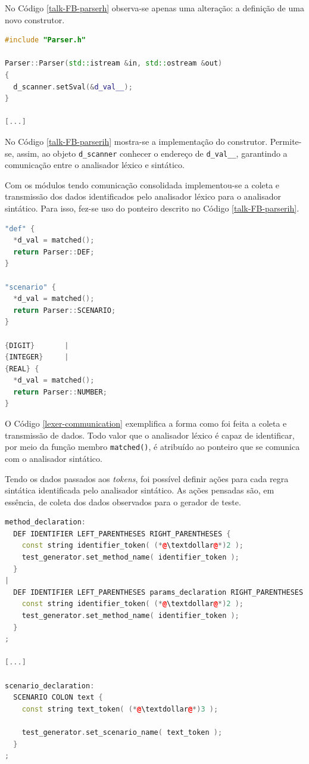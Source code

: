 \par
\indent No Código \ref{talk-FB-parserh} observa-se apenas uma alteração: a definição de uma novo construtor.
\par
\begin{lstlisting}[language=C++, label=talk-FB-parserih, caption=Alterações no Parser.ih para comunicação entre Analisador Léxico e Sintático]
#include "Parser.h"

Parser::Parser(std::istream &in, std::ostream &out)
{
  d_scanner.setSval(&d_val__);  
}

[...]
\end{lstlisting}
\par
\indent No Código \ref{talk-FB-parserih} mostra-se a implementação do construtor. Permite-se, assim, ao objeto \lstinline|d_scanner| conhecer o endereço de \lstinline|d_val__|, garantindo a comunicação entre o analisador léxico e sintático.
\par
\indent Com os módulos tendo comunicação consolidada implementou-se a coleta e transmissão dos dados identificados pelo analisador léxico para o analisador sintático. Para isso, fez-se uso do ponteiro descrito no Código \ref{talk-FB-parserih}.
\par
\begin{lstlisting}[language=C++, label=lexer-communication, caption=Estabelecendo coleta e transmissão de dados entre analisador léxico e sintático]
"def" {
  *d_val = matched();
  return Parser::DEF;
}

"scenario" {
  *d_val = matched();
  return Parser::SCENARIO;
}

{DIGIT}       |
{INTEGER}     |
{REAL} {
  *d_val = matched();
  return Parser::NUMBER;
}
\end{lstlisting}
\par
\indent O Código \ref{lexer-communication} exemplifica a forma como foi feita a coleta e transmissão de dados. Todo valor que o analisador léxico é capaz de identificar, por meio da função membro \lstinline|matched()|, é atribuído ao ponteiro que se comunica com o analisador sintático.
\par
\indent Tendo os dados passados aos \textit{tokens}, foi possível definir ações para cada regra sintática identificada pelo analisador sintático. As ações pensadas são, em essência, de coleta dos dados observados para o gerador de teste.
\begin{lstlisting}[language=C++, label=grammar-action, caption=Definindo ações para as regras do analisador sintático]
method_declaration:
  DEF IDENTIFIER LEFT_PARENTHESES RIGHT_PARENTHESES {
    const string identifier_token( (*@\textdollar@*)2 );
    test_generator.set_method_name( identifier_token );
  }
|
  DEF IDENTIFIER LEFT_PARENTHESES params_declaration RIGHT_PARENTHESES {
    const string identifier_token( (*@\textdollar@*)2 );
    test_generator.set_method_name( identifier_token );
  }
;

[...]

scenario_declaration:
  SCENARIO COLON text {
    const string text_token( (*@\textdollar@*)3 );
  
    test_generator.set_scenario_name( text_token );
  }
;
\end{lstlisting}
